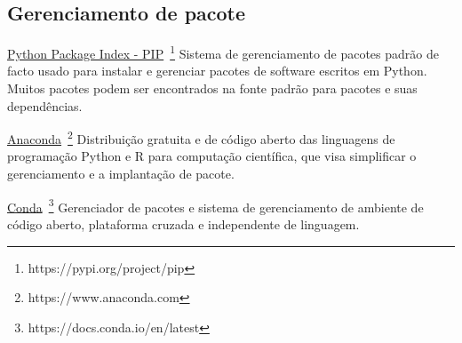 \subsection{Gerenciamento de pacote}

\underline{Python Package Index - PIP}~\footnote{https://pypi.org/project/pip}
Sistema de gerenciamento de pacotes padrão de facto usado para instalar e gerenciar pacotes de software escritos em Python. 
Muitos pacotes podem ser encontrados na fonte padrão para pacotes e suas dependências.

\underline{Anaconda}~\footnote{https://www.anaconda.com} 
Distribuição gratuita e de código aberto das linguagens de programação Python e R para computação científica, que visa simplificar o gerenciamento e a implantação de pacote.

\underline{Conda}~\footnote{https://docs.conda.io/en/latest}
Gerenciador de pacotes e sistema de gerenciamento de ambiente de código aberto, plataforma cruzada e independente de linguagem.
